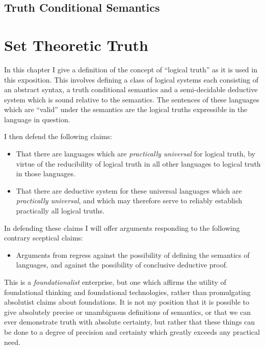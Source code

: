 \documentclass[10pt,titlepage]{book}
\begin{document}
\subsection{Truth Conditional Semantics}


\section{Set Theoretic Truth}

In this chapter I give a definition of the concept of ``logical truth'' as it is used in this exposition.
This involves defining a class of logical systems each consisting of an abstract syntax, a truth conditional semantics and a semi-decidable deductive system which is sound relative to the semantics.
The sentences of these languages which are ``valid'' under the semantics are the logical truths expressible in the language in question.

I then defend the following claims:

\begin{itemize}

\item That there are languages which are \emph{practically universal} for logical truth, by virtue of the reducibility of logical truth in all other languages to logical truth in those languages.
\item That there are deductive system for these universal languages which are \emph{practically universal}, and which may therefore serve to reliably establish practically all logical truths.
\end{itemize}

In defending these claims I will offer arguments responding to the following contrary sceptical claims:

\begin{itemize}
\item Arguments from regress against the possibility of defining the semantics of languages, and against the possibility of conclusive deductive proof.
\end{itemize}

This is a \emph{foundationalist} enterprise, but one which affirms the utility of foundational thinking and foundational technologies, rather than promulgating absolutist claims about foundations.
It is not my position that it is possible to give absolutely precise or unambiguous definitions of semantics, or that we can ever demonstrate truth with absolute certainty, but rather that these things can be done to a degree of precision and certainty which greatly exceeds any practical need.
\end{document}
